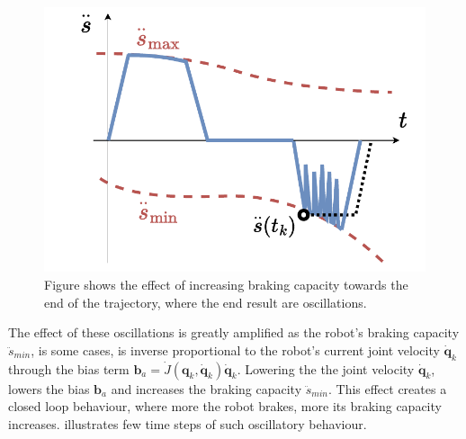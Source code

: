 \begin{figure}
    \centering
    \includegraphics[width=\linewidth]{Papers/imgs/oscil_how_it_looks.pdf}
    \caption{Figure shows the effect of increasing braking capacity towards the end of the trajectory, where the end result are oscillations. }
    \label{fig:oscil_expl}
\end{figure}
The effect of these oscillations is greatly amplified as the robot's braking capacity $\ddot{s}_{min}$, is some cases, is inverse proportional to the robot's current joint velocity $\dot{\bm{q}}_{k}$ through the bias term $\bm{b}_a = \dot{J}(\bm{q}_k,\dot{\bm{q}}_k)\dot{\bm{q}}_k$. Lowering the the joint velocity $\dot{\bm{q}}_{k}$, lowers the bias $\bm{b}_a$ and increases the braking capacity $\ddot{s}_{min}$. This effect creates a closed loop behaviour, where more the robot brakes, more its braking capacity increases.  illustrates few time steps of such oscillatory behaviour.

